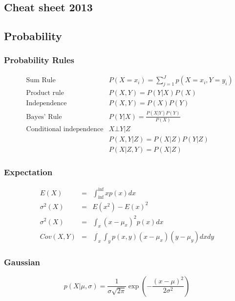 \documentclass[main]{subfiles}
\begin{document}
\begin{landscape}
\section{Cheat sheet 2013}
%
%
\begin{multicols}{3}
\scriptsize
\subsection{Probability}
\subsubsection{Probability Rules}
\begin{eqnarray}
&\text{Sum Rule}& P(X=x_i) = \sum_{j=1}^{J} p(X=x_i,Y=y_i)\\
&\text{Product rule}& P(X, Y) = P(Y|X) P(X) \\
&\text{Independence}& P(X, Y) = P(X)P(Y) \\
&\text{Bayes' Rule}& P(Y|X) = \frac{P(X|Y)P(Y)}{P(X)} \\
&\text{Conditional independence}& X\bot Y|Z \\
& & P(X,Y|Z) = P(X|Z)P(Y|Z) \\
& & P(X|Z,Y) = P(X|Z)
\end{eqnarray}
\subsubsection{Expectation}
\begin{eqnarray}
E(X) &=& \int_{\inf}^{\inf} x p(x) dx \\
\sigma^2(X) &=& E(x^2)-{E(x)}^2 \\
\sigma^2(X) &=& \int_x (x-\mu_x)^2 p(x) dx \\
Cov(X, Y) &=& \int_x \int_y p(x,y) (x-\mu_x)(y-\mu_y) dx dy
\end{eqnarray}

\subsubsection{Gaussian}
\begin{equation}
p(X|\mu,\sigma)=\frac{1}{\sigma \sqrt{2\pi}} \exp(-\frac{(x-\mu)^2}{2\sigma^2})
\end{equation}


\end{multicols}
\end{landscape}
\end{document}
